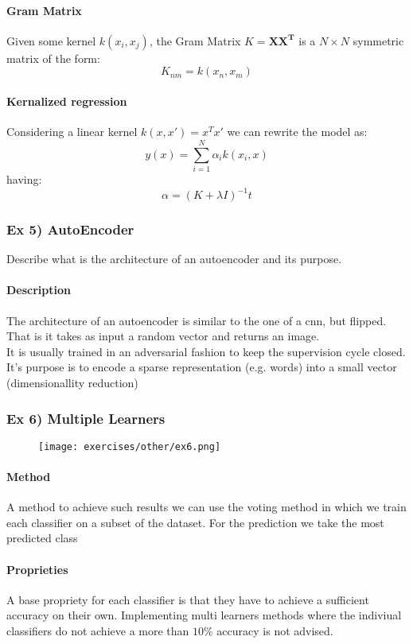 \paragraph{Gram Matrix}
Given some kernel $k(x_i,x_j)$, the Gram Matrix $K=\bm{XX^T}$ is a $N\times N$ symmetric matrix of the form:
\[K_{nm}=k(x_n,x_m)\]

\paragraph{Kernalized regression}
Considering a linear kernel $k(x,x')=x^Tx'$ we can rewrite the model as:
\[y(x)=\sum_{i=1}^N\alpha_i k(x_i,x)\]
having:
\[\alpha=(K+\lambda I)^{-1}t\]


\subsubsection{Ex 5) AutoEncoder}
Describe what is the architecture of an autoencoder and its purpose.

\paragraph{Description}
The architecture of an autoencoder is similar to the one of a cnn, but flipped. That is it takes as input a random vector and returns an image.\\
It is usually trained in an adversarial fashion to keep the supervision cycle closed.\\
It's purpose is to encode a sparse representation (e.g. words) into a small vector (dimensionallity reduction)

\subsubsection{Ex 6) Multiple Learners}

\begin{figure}[H]
    \centering
    \texttt{[image: exercises/other/ex6.png]}
\end{figure}

\paragraph{Method}
A method to achieve such results we can use the voting method in which we train each classifier on a subset of the dataset. For the prediction we take the most predicted class

\paragraph{Proprieties}
A base propriety for each classifier is that they have to achieve a sufficient accuracy on their own. Implementing multi learners methods where the indiviual classifiers do not achieve a more than $10\%$ accuracy is not advised.

